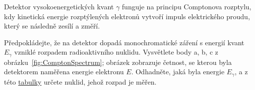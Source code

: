         Detektor vysokoenergetických kvant $\gamma$ funguje na principu Comptonova rozptylu, kdy kinetická energie rozptýlených elektronů vytvoří impuls elektrického proudu, který se následně zesílí a změří.

        Předpokládejte, že na detektor dopadá monochromatické záření s energií kvant $E_{\gamma}$ vzniklé rozpadem radioaktivního nuklidu.
        Vysvětlete body a, b, c z obrázku~\ref{fig:ComptonSpectrum}; obrázek zobrazuje četnost, se kterou byla detektorem naměřena energie elektronu $E$. 
        Odhadněte, jaká byla energie $E_{\gamma}$, a z této \href{https://cds.cern.ch/record/1309915/files/978-3-642-02586-0_BookBackMatter.pdf}{tabulky} určete nuklid, jehož rozpad je měřen.

